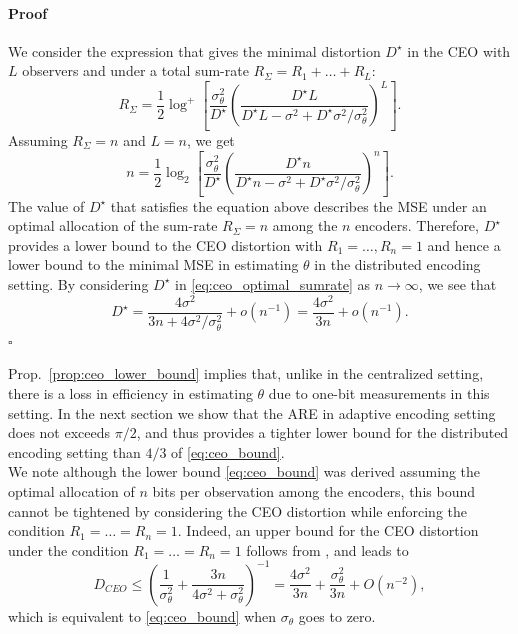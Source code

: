 \documentclass[letterpaper, conference,9pt]{IEEEtran}      %
\newenvironment{proof}{\paragraph*{Proof}}{\hfill$\square$ \newline}
\begin{document}
\begin{proof}
We consider the expression \cite[Eq. 10]{chen2004upper} that gives the minimal distortion $D^\star$ in the CEO with $L$ observers and under a total sum-rate $R_\Sigma = R_1 + \ldots +R_L$:
\begin{equation} \label{eq:ceo_optimal_sumrate}
R_{\Sigma} = \frac{1}{2} \log^+ \left[ \frac{\sigma_\theta^2}{D^\star} \left( \frac{D^\star L}{ D^\star L - \sigma^2 + D^\star \sigma^2 / \sigma_\theta^2 }\right)^L  \right].
\end{equation}
Assuming $R_\Sigma = n$ and $L=n$, we get
\begin{equation} \label{eq:ceo_optimal_sumrate}
n = \frac{1}{2} \log_2 \left[ \frac{\sigma_\theta^2}{D^\star} \left(\frac{ D^\star n }{D^\star n - \sigma^2 + D^\star \sigma^2/\sigma_\theta^2 }  \right)^n  \right].
\end{equation}
The value of $D^\star$ that satisfies the equation above describes the MSE under an optimal allocation of the sum-rate $R_\Sigma = n$ among the $n$ encoders. Therefore, $D^\star$ provides a lower bound to the CEO distortion with $R_1=\ldots,R_n = 1$ and hence a lower bound to the minimal MSE in estimating $\theta$ in the distributed encoding setting. By considering $D^\star$ in \eqref{eq:ceo_optimal_sumrate} as $n\rightarrow \infty$, we see that 
\[
D^\star = \frac{ 4\sigma^2 }{3n + 4 \sigma^2 / \sigma_\theta^2 } + o(n^{-1}) =  \frac{4\sigma^2}{3n} + o(n^{-1}). 
\]
\end{proof}

Prop.~\ref{prop:ceo_lower_bound} implies that, unlike in the centralized setting, there is a loss in efficiency in estimating $\theta$ due to one-bit measurements in this setting. In the next section we show that the ARE in adaptive encoding setting does not exceeds $\pi/2$, and thus provides a tighter lower bound for the distributed encoding setting than $4/3$ of  \eqref{eq:ceo_bound}. \\

We note although the lower bound \eqref{eq:ceo_bound} was derived assuming the optimal allocation of $n$ bits per observation among the encoders, this bound cannot be tightened by considering the CEO distortion while enforcing the condition $R_1=\ldots = R_n = 1$. Indeed, an upper bound for the CEO distortion under the condition $R_1=\ldots = R_n = 1$ follows from \cite{KipnisRini2017}, and leads to
\[
D_{CEO} \leq  \left( \frac{1}{\sigma_\theta^2} +  \frac{3n}{4\sigma^2 + \sigma_\theta^2} \right)^{-1}   =
\frac{4 \sigma^2}{3n} +  \frac{\sigma_\theta^2}{3n} + O(n^{-2}),
\]
which is equivalent to \eqref{eq:ceo_bound} when $\sigma_\theta$ goes to zero. 
\end{document}
